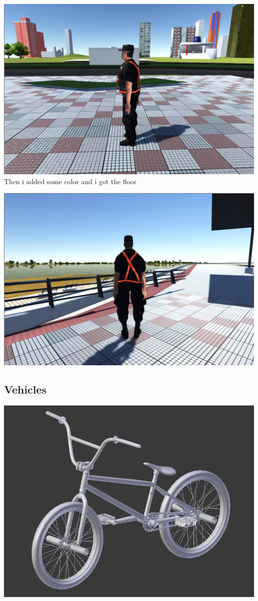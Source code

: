 \documentclass{article}
\begin{document}
  \includegraphics[width=\textwidth]{41.jpg}
  Then i added some color and i got the floor
  
  \includegraphics[width=\textwidth]{42.jpg}
  
  \subsection{Vehicles}

  \includegraphics[width=\textwidth]{12.png}
\end{document}
